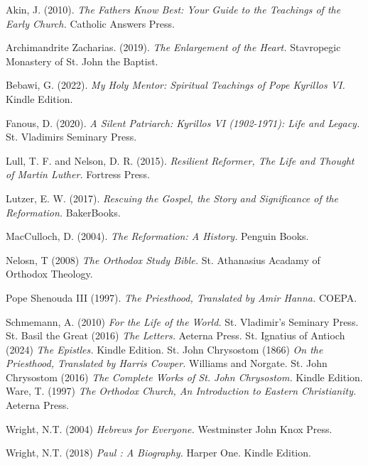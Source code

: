 \documentclass[12pt, doc]{apa7}   	%
\begin{document}
\begin{thebibliography}{15}

Akin, J. (2010). \emph{The Fathers Know Best: Your Guide to the Teachings of the Early Church.} Catholic Answers Press.
    
Archimandrite Zacharias. (2019). \emph{The Enlargement of the Heart.} Stavropegic Monastery of St. John the Baptist.

Bebawi, G. (2022). \emph{My Holy Mentor: Spiritual Teachings of Pope Kyrillos VI.} Kindle Edition.

Fanous, D. (2020). \emph{A Silent Patriarch: Kyrillos VI (1902-1971): Life and Legacy.} St. Vladimirs Seminary Press.

Lull, T. F. and Nelson, D. R. (2015). \emph{Resilient Reformer, The Life and Thought of Martin Luther.} Fortress Press.

Lutzer, E. W. (2017). \emph{Rescuing the Gospel, the Story and Significance of the Reformation.} BakerBooks.

MacCulloch, D. (2004). \emph{The Reformation: A History.} Penguin Books.

Nelosn, T (2008) \emph{The Orthodox Study Bible.} St. Athanasius Acadamy of Orthodox Theology.

Pope Shenouda III (1997). \emph{The Priesthood, Translated by Amir Hanna.} COEPA. 

Schmemann, A. (2010) \emph{For the Life of the World.} St. Vladimir's Seminary Press.
St. Basil the Great (2016) \emph{The Letters.} Aeterna Press.
St. Ignatius of Antioch (2024) \emph{The Epistles.} Kindle Edition.
St. John Chrysostom  (1866) \emph{On the Priesthood, Translated by Harris Cowper.}  Williams and Norgate. 
St. John Chrysostom  (2016) \emph{The Complete Works of St. John Chrysostom.}  Kindle Edition. 
Ware, T. (1997) \emph{The Orthodox Church, An Introduction to Eastern Christianity.} Aeterna Press.

Wright, N.T. (2004) \emph{Hebrews for Everyone.} Westminster John Knox Press.


Wright, N.T. (2018) \emph{Paul : A Biography.} Harper One.  Kindle Edition.


\end{thebibliography}
\end{document}
